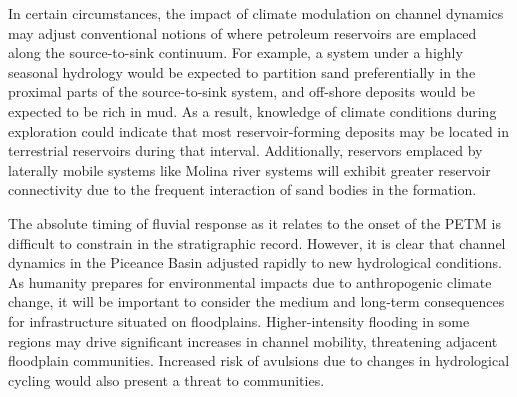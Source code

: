 \documentclass[draft]{compact_proposal}
\begin{document}
In certain circumstances, the impact of climate modulation on channel dynamics may adjust conventional notions of where petroleum reservoirs are emplaced along the source-to-sink continuum.
For example, a system under a highly seasonal hydrology would be expected to partition sand preferentially in the proximal parts of the source-to-sink system, and off-shore deposits would be expected to be rich in mud.
As a result, knowledge of climate conditions during exploration could indicate that most reservoir-forming deposits may be located in terrestrial reservoirs during that interval.
Additionally, reservors emplaced by laterally mobile systems like Molina river systems will exhibit greater reservoir connectivity due to the frequent interaction of sand bodies in the formation.

The absolute timing of fluvial response as it relates to the onset of the PETM is difficult to constrain in the stratigraphic record.
However, it is clear that channel dynamics in the Piceance Basin adjusted rapidly to new hydrological conditions.
As humanity prepares for environmental impacts due to anthropogenic climate change, it will be important to consider the medium and long-term consequences for infrastructure situated on floodplains.
Higher-intensity flooding in some regions may drive significant increases in channel mobility, threatening adjacent floodplain communities.
Increased risk of avulsions due to changes in hydrological cycling would also present a threat to communities.


\end{document}
